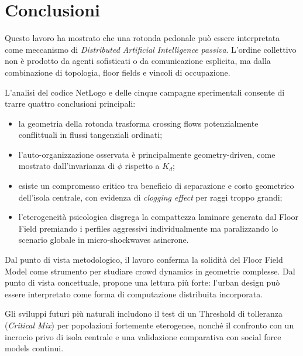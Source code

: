 \section{Conclusioni}
Questo lavoro ha mostrato che una rotonda pedonale può essere interpretata come meccanismo di \textit{Distributed Artificial Intelligence passiva}. L'ordine collettivo non è prodotto da agenti sofisticati o da comunicazione esplicita, ma dalla combinazione di topologia, floor fields e vincoli di occupazione.

L'analisi del codice NetLogo e delle cinque campagne sperimentali consente di trarre quattro conclusioni principali:
\begin{itemize}
\item la geometria della rotonda trasforma crossing flows potenzialmente conflittuali in flussi tangenziali ordinati;
\item l'auto-organizzazione osservata è principalmente geometry-driven, come mostrato dall'invarianza di $\phi$ rispetto a $K_d$;
\item esiste un compromesso critico tra beneficio di separazione e costo geometrico dell'isola centrale, con evidenza di \textit{clogging effect} per raggi troppo grandi;
\item l'eterogeneità psicologica disgrega la compattezza laminare generata dal Floor Field premiando i perfiles aggressivi individualmente ma paralizzando lo scenario globale in micro-shockwaves asincrone.
\end{itemize}

Dal punto di vista metodologico, il lavoro conferma la solidità del Floor Field Model come strumento per studiare crowd dynamics in geometrie complesse. Dal punto di vista concettuale, propone una lettura più forte: l'urban design può essere interpretato come forma di computazione distribuita incorporata.

Gli sviluppi futuri più naturali includono il test di un Threshold di tolleranza (\textit{Critical Mix}) per popolazioni fortemente eterogenee, nonché il confronto con un incrocio privo di isola centrale e una validazione comparativa con social force models continui.
